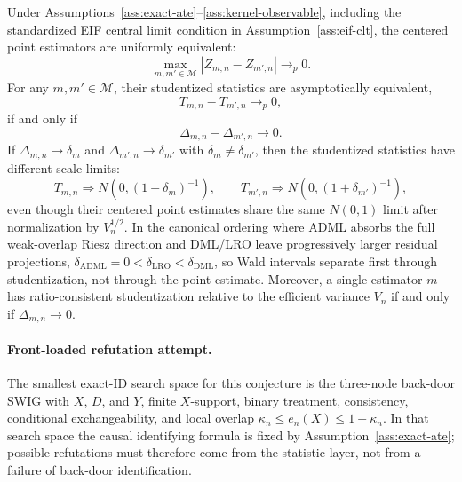 \begin{theorem}\label{thm:student-frontier}
Under Assumptions~\ref{ass:exact-ate}--\ref{ass:kernel-observable}, including the standardized EIF central limit condition in Assumption~\ref{ass:eif-clt}, the centered point estimators are uniformly equivalent:
\[
  \max_{m,m'\in\mathcal M}|Z_{m,n}-Z_{m',n}|\to_p0.
\]
For any \(m,m'\in\mathcal M\), their studentized statistics are asymptotically equivalent,
\[
  T_{m,n}-T_{m',n}\to_p0,
\]
if and only if
\[
  \Delta_{m,n}-\Delta_{m',n}\to0.
\]
If \(\Delta_{m,n}\to\delta_m\) and \(\Delta_{m',n}\to\delta_{m'}\) with \(\delta_m\ne\delta_{m'}\), then the studentized statistics have different scale limits:
\[
  T_{m,n}\Rightarrow N(0,(1+\delta_m)^{-1}),\qquad
  T_{m',n}\Rightarrow N(0,(1+\delta_{m'})^{-1}),
\]
even though their centered point estimates share the same \(N(0,1)\) limit after normalization by \(V_n^{1/2}\).  In the canonical ordering where ADML absorbs the full weak-overlap Riesz direction and DML/LRO leave progressively larger residual projections, \(\delta_{\mathrm{ADML}}=0<\delta_{\mathrm{LRO}}<\delta_{\mathrm{DML}}\), so Wald intervals separate first through studentization, not through the point estimate.  Moreover, a single estimator \(m\) has ratio-consistent studentization relative to the efficient variance \(V_n\) if and only if \(\Delta_{m,n}\to0\).
\end{theorem}

\paragraph{Front-loaded refutation attempt.}
The smallest exact-ID search space for this conjecture is the three-node
back-door SWIG with \(X\), \(D\), and \(Y\), finite \(X\)-support, binary
treatment, consistency, conditional exchangeability, and local overlap
\(\kappa_n\le e_n(X)\le1-\kappa_n\).  In that search space the causal
identifying formula is fixed by Assumption~\ref{ass:exact-ate}; possible
refutations must therefore come from the statistic layer, not from a failure
of back-door identification.

